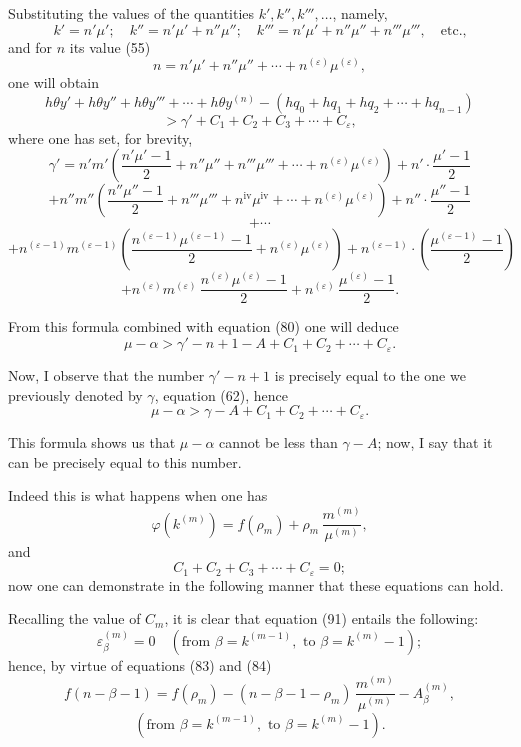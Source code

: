 \documentclass{article}
\begin{document}
Substituting the values of the quantities $k', k'', k''', \ldots$, namely,
\[ k' = n'\mu'; \quad k'' = n'\mu' + n''\mu''; \quad k''' = n'\mu' + n''\mu'' + n'''\mu''', \quad \text{etc.,} \]
and for $n$ its value (55)
\[ n = n'\mu' + n''\mu'' + \cdots + n^{(\varepsilon)}\mu^{(\varepsilon)}, \]
one will obtain
\[ h\theta y' + h\theta y'' + h\theta y''' + \cdots + h\theta y^{(n)} - (hq_0+hq_1+hq_2+\cdots+hq_{n-1}) \]
\[ > \gamma' + C_1 + C_2 + C_3 + \cdots + C_\varepsilon, \]
where one has set, for brevity,
\[ \gamma' = n'm'\left(\frac{n'\mu'-1}{2}+n''\mu''+n'''\mu'''+\cdots+n^{(\varepsilon)}\mu^{(\varepsilon)}\right)+n' \cdot \frac{\mu'-1}{2} \]
\[ + n''m''\left(\frac{n''\mu''-1}{2}+n'''\mu'''+n^{\text{iv}}\mu^{\text{iv}}+\cdots+n^{(\varepsilon)}\mu^{(\varepsilon)}\right)+n'' \cdot \frac{\mu''-1}{2} \]
\[ + \cdots \]
\[ + n^{(\varepsilon-1)}m^{(\varepsilon-1)}\left(\frac{n^{(\varepsilon-1)}\mu^{(\varepsilon-1)}-1}{2}+n^{(\varepsilon)}\mu^{(\varepsilon)}\right)+n^{(\varepsilon-1)} \cdot \left(\frac{\mu^{(\varepsilon-1)}-1}{2}\right) \]
\[ + n^{(\varepsilon)}m^{(\varepsilon)}\,\frac{n^{(\varepsilon)}\mu^{(\varepsilon)}-1}{2}+n^{(\varepsilon)}\,\frac{\mu^{(\varepsilon)}-1}{2}. \tag{88} \]

From this formula combined with equation (80) one will deduce
\[ \mu - \alpha > \gamma' - n + 1 - A + C_1 + C_2 + \cdots + C_\varepsilon. \tag{89} \]

Now, I observe that the number $\gamma' - n + 1$ is precisely equal to the one we previously denoted by $\gamma$, equation (62), hence
\[ \mu - \alpha > \gamma - A + C_1 + C_2 + \cdots + C_\varepsilon. \tag{90} \]

This formula shows us that $\mu-\alpha$ cannot be less than $\gamma-A$; now, I say that it can be precisely equal to this number.

Indeed this is what happens when one has
\[ \varphi(k^{(m)}) = f(\rho_m) + \rho_m\,\frac{m^{(m)}}{\mu^{(m)}}, \tag{91} \]
and
\[ C_1 + C_2 + C_3 + \cdots + C_\varepsilon = 0; \]
now one can demonstrate in the following manner that these equations can hold.

Recalling the value of $C_m$, it is clear that equation (91) entails the following:
\[ \varepsilon_\beta^{(m)} = 0 \quad (\text{from } \beta = k^{(m-1)}, \text{ to } \beta = k^{(m)}-1); \]
hence, by virtue of equations (83) and (84)
\[ f(n-\beta-1) = f(\rho_m) - (n-\beta-1-\rho_m)\,\frac{m^{(m)}}{\mu^{(m)}} - A_\beta^{(m)}, \]
\[ (\text{from } \beta = k^{(m-1)}, \text{ to } \beta = k^{(m)}-1). \tag{92} \]
\end{document}
